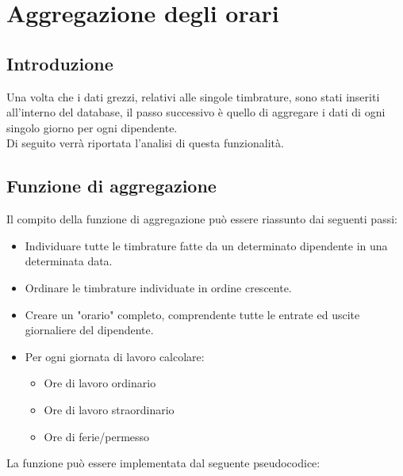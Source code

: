 \chapter{Aggregazione degli orari}
\section{Introduzione}
Una volta che i dati grezzi, relativi alle singole timbrature, sono stati inseriti all'interno del database, il passo successivo è quello di aggregare i dati di ogni singolo giorno per ogni dipendente.\\
Di seguito verrà riportata l'analisi di questa funzionalità.
\section{Funzione di aggregazione}
Il compito della funzione di aggregazione può essere riassunto dai seguenti passi:
\begin{itemize}
	\item Individuare tutte le timbrature fatte da un determinato dipendente in una determinata data.
	\item Ordinare le timbrature individuate in ordine crescente.
	\item Creare un "orario" completo, comprendente tutte le entrate ed uscite giornaliere del dipendente.
	\item Per ogni giornata di lavoro calcolare:
		\begin{itemize}
			\item Ore di lavoro ordinario
			\item Ore di lavoro straordinario
			\item Ore di ferie/permesso
		\end{itemize}
\end{itemize}
La funzione può essere implementata dal seguente pseudocodice:

